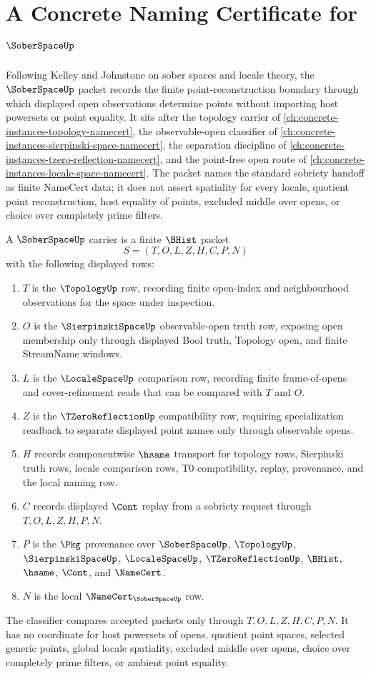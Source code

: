 \chapter{A Concrete Naming Certificate for $\SoberSpaceUp$}
\label{ch:concrete-instances-sober-space-namecert}

Following Kelley and Johnstone on sober spaces and locale theory, the $\SoberSpaceUp$ packet records the finite point-reconstruction boundary through which displayed open observations determine points without importing host powersets or point equality. It sits after the topology carrier of \autoref{ch:concrete-instances-topology-namecert}, the observable-open classifier of \autoref{ch:concrete-instances-sierpinski-space-namecert}, the separation discipline of \autoref{ch:concrete-instances-tzero-reflection-namecert}, and the point-free open route of \autoref{ch:concrete-instances-locale-space-namecert}. The packet names the standard sobriety handoff as finite NameCert data; it does not assert spatiality for every locale, quotient point reconstruction, host equality of points, excluded middle over opens, or choice over completely prime filters.

\begin{definition}
\label{def:sober-space-carrier}
A $\SoberSpaceUp$ carrier is a finite $\BHist$ packet
$$
S=(T,O,L,Z,H,C,P,N)
$$
with the following displayed rows:
\begin{enumerate}
\item $T$ is the $\TopologyUp$ row, recording finite open-index and neighbourhood observations for the space under inspection.
\item $O$ is the $\SierpinskiSpaceUp$ observable-open truth row, exposing open membership only through displayed Bool truth, Topology open, and finite StreamName windows.
\item $L$ is the $\LocaleSpaceUp$ comparison row, recording finite frame-of-opens and cover-refinement reads that can be compared with $T$ and $O$.
\item $Z$ is the $\TZeroReflectionUp$ compatibility row, requiring specialization readback to separate displayed point names only through observable opens.
\item $H$ records componentwise $\hsame$ transport for topology rows, Sierpinski truth rows, locale comparison rows, T0 compatibility, replay, provenance, and the local naming row.
\item $C$ records displayed $\Cont$ replay from a sobriety request through $T,O,L,Z,H,P,N$.
\item $P$ is the $\Pkg$ provenance over $\SoberSpaceUp$, $\TopologyUp$, $\SierpinskiSpaceUp$, $\LocaleSpaceUp$, $\TZeroReflectionUp$, $\BHist$, $\hsame$, $\Cont$, and $\NameCert$.
\item $N$ is the local $\NameCert_{\SoberSpaceUp}$ row.
\end{enumerate}
The classifier compares accepted packets only through $T,O,L,Z,H,C,P,N$. It has no coordinate for host powersets of opens, quotient point spaces, selected generic points, global locale spatiality, excluded middle over opens, choice over completely prime filters, or ambient point equality.
\end{definition}

